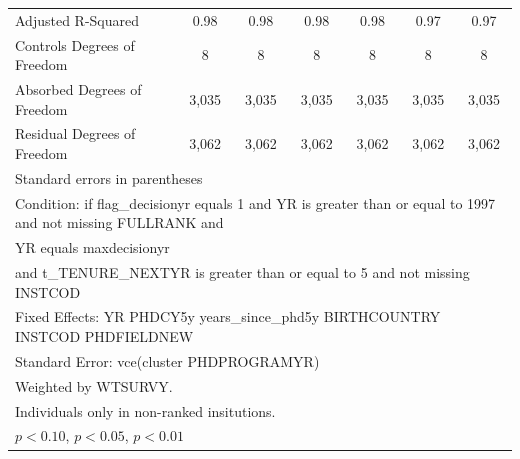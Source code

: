 \begin{table}[htbp]
\begin{tabular}{l*{6}{c}}
Adjusted R-Squared&        0.98         &        0.98         &        0.98         &        0.98         &        0.97         &        0.97         \\
Controls Degrees of Freedom&           8         &           8         &           8         &           8         &           8         &           8         \\
Absorbed Degrees of Freedom&       3,035         &       3,035         &       3,035         &       3,035         &       3,035         &       3,035         \\
Residual Degrees of Freedom&       3,062         &       3,062         &       3,062         &       3,062         &       3,062         &       3,062         \\
\hline\hline
\multicolumn{7}{l}{\footnotesize Standard errors in parentheses}\\
\multicolumn{7}{l}{\footnotesize Condition: if flag\_decisionyr equals 1 and YR is greater than or equal to 1997 and not missing FULLRANK and}\\
\multicolumn{7}{l}{\footnotesize YR equals maxdecisionyr}\\
\multicolumn{7}{l}{\footnotesize and t\_TENURE\_NEXTYR is greater than or equal to 5 and not missing INSTCOD}\\
\multicolumn{7}{l}{\footnotesize Fixed Effects: YR PHDCY5y years\_since\_phd5y BIRTHCOUNTRY INSTCOD PHDFIELDNEW}\\
\multicolumn{7}{l}{\footnotesize Standard Error: vce(cluster PHDPROGRAMYR)}\\
\multicolumn{7}{l}{\footnotesize Weighted by WTSURVY.}\\
\multicolumn{7}{l}{\footnotesize Individuals only in non-ranked insitutions.}\\
\multicolumn{7}{l}{\footnotesize \sym{*} \(p<0.10\), \sym{**} \(p<0.05\), \sym{***} \(p<0.01\)}\\
\end{tabular}
\end{table}
